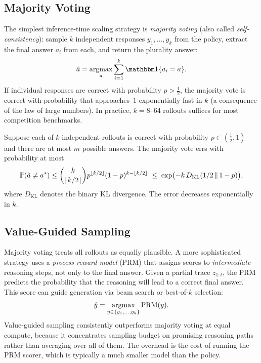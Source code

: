 \subsection{Majority Voting}
\label{subsec:majority-voting}

The simplest inference-time scaling strategy is \emph{majority
voting} (also called \emph{self-consistency}):
sample $k$ independent responses $y_1, \ldots, y_k$ from the policy,
extract the final answer $a_i$ from each, and return the plurality
answer:
\begin{equation}
\label{eq:majority-vote}
\hat{a} = \argmax_{a} \sum_{i=1}^{k} \ind\{a_i = a\}.
\end{equation}
If individual responses are correct with probability $p >
\frac{1}{2}$, the majority vote is correct with probability that
approaches~$1$ exponentially fast in $k$ (a consequence of the
law of large numbers). In practice, $k = 8$--$64$ rollouts
suffices for most competition benchmarks.

\begin{proposition}
\label{prop:majority-vote}
Suppose each of $k$ independent rollouts is correct with probability
$p \in (\frac{1}{2}, 1)$ and there are at most $m$ possible answers.
The majority vote errs with probability at most
\[
\mathbb{P}(\hat{a} \ne a^*) \le
\binom{k}{\lfloor k/2 \rfloor} p^{\lfloor k/2 \rfloor}(1-p)^{k - \lfloor k/2 \rfloor}
\;\le\; \exp\bigl(-k\,D_{\mathrm{KL}}(1/2 \,\|\, 1-p)\bigr),
\]
where $D_{\mathrm{KL}}$ denotes the binary KL divergence. The error
decreases exponentially in $k$.
\end{proposition}

\subsection{Value-Guided Sampling}
\label{subsec:value-guided}

Majority voting treats all rollouts as equally plausible. A more
sophisticated strategy uses a \emph{process reward model}
(PRM) that assigns scores to
\emph{intermediate} reasoning steps, not only to the final answer.
Given a partial trace $z_{1:t}$, the PRM predicts the probability
that the reasoning will lead to a correct final answer. This score
can guide generation via beam search or best-of-$k$ selection:
\begin{equation}
\label{eq:prm-selection}
\hat{y} = \operatorname*{argmax}_{y \in \{y_1,\ldots,y_k\}} \mathrm{PRM}(y).
\end{equation}
Value-guided sampling consistently outperforms majority voting at equal
compute, because it concentrates sampling budget on promising reasoning
paths rather than averaging over all of them. The overhead is the cost
of running the PRM scorer, which is typically a much smaller model
than the policy.

